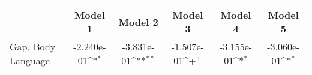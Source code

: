 {
\def\sym#1{\ifmmode^{#1}\else\(^{#1}\)\fi}
\begin{tabular}{l*{5}{c}}
    \toprule
                             & \multicolumn{1}{c}{Model 1} & \multicolumn{1}{c}{Model 2} & \multicolumn{1}{c}{Model 3} & \multicolumn{1}{c}{Model 4} & \multicolumn{1}{c}{Model 5} \\
    \midrule
    Gap, Body Language       & -2.240e-01\sym{*}           & -3.831e-01\sym{**}          & -1.507e-01\sym{+}           & -3.155e-01\sym{*}           & -3.060e-01\sym{*}           \\

\end{tabular}}
